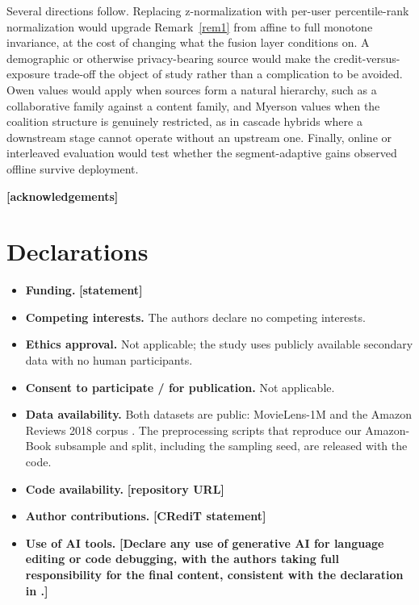 \documentclass[pdflatex,sn-mathphys-num]{sn-jnl}%
\theoremstyle{thmstyleone}%
\theoremstyle{thmstyletwo}%
\theoremstyle{thmstylethree}%
\newcommand{\tbd}[1]{\textbf{[#1]}}
\begin{document}
Several directions follow. Replacing z-normalization with per-user percentile-rank normalization would upgrade Remark~\ref{rem1} from affine to full monotone invariance, at the cost of changing what the fusion layer conditions on. A demographic or otherwise privacy-bearing source would make the credit-versus-exposure trade-off the object of study rather than a complication to be avoided. Owen values \cite{owen1977} would apply when sources form a natural hierarchy, such as a collaborative family against a content family, and Myerson values \cite{myerson1977} when the coalition structure is genuinely restricted, as in cascade hybrids where a downstream stage cannot operate without an upstream one. Finally, online or interleaved evaluation would test whether the segment-adaptive gains observed offline survive deployment.

\backmatter

\tbd{acknowledgements}

\section*{Declarations}

\begin{itemize}
\item \textbf{Funding.} \tbd{statement}
\item \textbf{Competing interests.} The authors declare no competing interests.
\item \textbf{Ethics approval.} Not applicable; the study uses publicly available secondary data with no human participants.
\item \textbf{Consent to participate / for publication.} Not applicable.
\item \textbf{Data availability.} Both datasets are public: MovieLens-1M \cite{harper2015} and the Amazon Reviews 2018 corpus \cite{ni2019}. The preprocessing scripts that reproduce our Amazon-Book subsample and split, including the sampling seed, are released with the code.
\item \textbf{Code availability.} \tbd{repository URL}
\item \textbf{Author contributions.} \tbd{CRediT statement}
\item \textbf{Use of AI tools.} \tbd{Declare any use of generative AI for language editing or code debugging, with the authors taking full responsibility for the final content, consistent with the declaration in \cite{nesmaoui2026drift}.}
\end{itemize}
\end{document}

